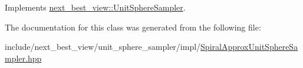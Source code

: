\-Implements \hyperlink{classnext__best__view_1_1UnitSphereSampler_a26213308b4c1047cc5a97d38a6990543}{next\-\_\-best\-\_\-view\-::\-Unit\-Sphere\-Sampler}.



\-The documentation for this class was generated from the following file\-:\begin{DoxyCompactItemize}
\item 
include/next\-\_\-best\-\_\-view/unit\-\_\-sphere\-\_\-sampler/impl/\hyperlink{SpiralApproxUnitSphereSampler_8hpp}{\-Spiral\-Approx\-Unit\-Sphere\-Sampler.\-hpp}\end{DoxyCompactItemize}
